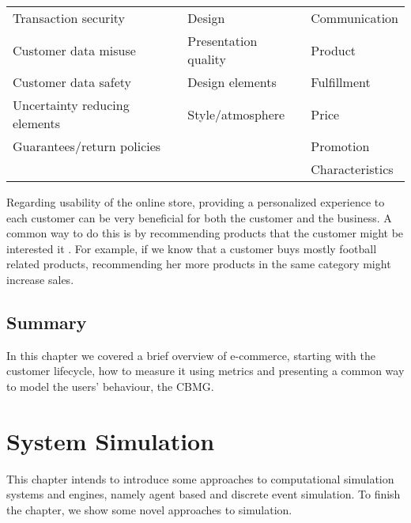 \begin{table}[h]
\begin{tabular}{lll}
    Transaction security                                 & 
    Design                                      & 
    Communication                               \\
    Customer data misuse                                 & Presentation 
    quality                        & 
    Product                                     \\
    Customer data safety                                 & Design 
    elements                             & 
    Fulfillment                                 \\
    Uncertainty reducing elements                        & 
    Style/atmosphere                            & 
    Price                                       \\
    Guarantees/return policies                           
    &                                             & 
    Promotion                                   \\
    &                                             & 
    Characteristics                            
\end{tabular}
\end{table}

Regarding usability of the online store, providing a personalized experience to 
each customer can be very beneficial for both the customer and the business. A 
common way to do this is by recommending products that the customer might be 
interested it \cite{Adomavicius2005}. For example, if we know that a customer 
buys mostly football related products, recommending her more products in the 
same category might increase sales.

\subsection{Summary}

In this chapter we covered a brief overview of e-commerce, starting with the 
customer lifecycle, how to measure it using metrics and presenting a common way 
to model the users' behaviour, the CBMG.

\section{System Simulation} \label{sec:simulation}

This chapter intends to introduce some approaches to computational simulation 
systems and engines, namely agent based and discrete event simulation. To 
finish the chapter, we show some novel approaches to simulation.

